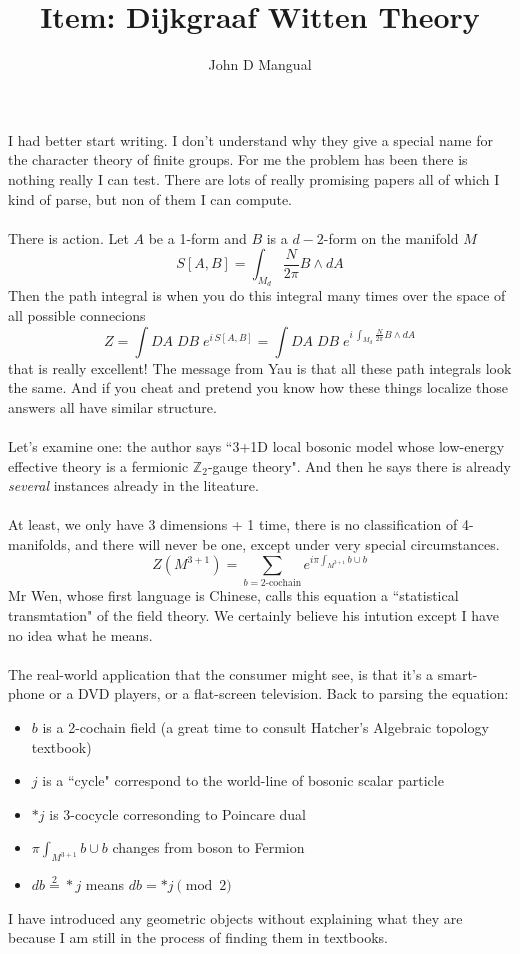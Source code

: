 \documentclass[12pt]{article}
\title{\textbf{Item: Dijkgraaf Witten Theory}}
\author{John D Mangual}
\date{}
\begin{document}
\selectfont \fontsize{12.5}{15}\selectfont

\maketitle

\noindent I had better start writing.  I don't understand why they give a special name for the character theory of finite groups.  For me the problem has been there is nothing really I can test.  There are lots of really promising papers all of which I kind of parse, but non of them I can compute. \\ \\
There is action.  Let $A$ be a 1-form and $B$ is a $d-2$-form on the manifold $M$
$$  S[A,B] = \int_{M_d}  \frac{N}{2\pi} B \wedge dA $$
Then the path integral is when you do this integral many times over the space of all possible connecions
$$ Z = \int DA \; DB \; e^{i \, S[A,B]} = \int DA \; DB \; e^{i \, \int_{M_d}  \frac{N}{2\pi} B \wedge dA} $$
that is really excellent!  The message from Yau is that all these path integrals look the same.  And if you cheat and pretend you know how these things localize those answers all have similar structure.  \\ \\
Let's examine one:  the author says  ``3+1D local bosonic model whose low-energy effective theory is a fermionic $\mathbb{Z}_2$-gauge theory".  And then he says there is already \textit{several} instances already in the liteature.  \\ \\
At least, we only have 3 dimensions + 1 time, there is no classification of 4-manifolds, and there will never be one, except under very special circumstances.  
$$ Z(M^{3+1}) = \sum_{b = \text{2-cochain}} e^{i \pi \int_{M^{3+1}} b\cup b} $$
Mr Wen, whose first language is Chinese, calls this equation a ``statistical transmtation" of the field theory.  We certainly believe his intution except I have no idea what he means.  \\ \\
The real-world application that the consumer might see, is that it's a smart-phone or a DVD players, or a flat-screen television. Back to parsing the equation:
\begin{itemize}
\item $b$ is a 2-cochain field (a great time to consult Hatcher's Algebraic topology textbook)
\item $j$ is a ``cycle" correspond to the world-line of bosonic scalar particle
\item $\ast j$ is 3-cocycle corresonding to Poincare dual
\item $\pi \int_{M^{3+1}} b \cup b$ changes from boson to Fermion
\item $db \stackrel{2}{=} \ast j $ means $db = \ast j \pmod 2$ 
\end{itemize}
I have introduced any geometric objects without explaining what they are because I am still in the process of finding them in textbooks.
\end{document}
